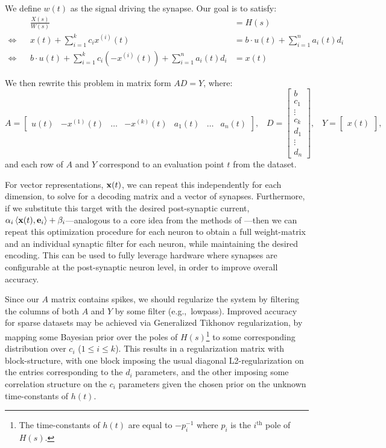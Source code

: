 We define ${w}(t)$ as the signal driving the synapse. Our goal is to satisfy:
\begin{align*}
    && \frac{{X}(s)}{{W}(s)} &= H(s) \\
    \iff && {x}(t) + \sum_{i=1}^k c_i {x}^{(i)}(t) &= {b} \cdot {u}(t) + \sum_{i=1}^n a_i(t) {d}_i \\
    \iff && {b} \cdot {u}(t) + \sum_{i=1}^k c_i \left(-{x}^{(i)}(t)\right) + \sum_{i=1}^n a_i(t) {d}_i &= {x}(t)
\end{align*}

We then rewrite this problem in matrix form $AD = Y$, where:
$$A = \left[ \begin{matrix} {u}(t) & -{x}^{(1)}(t) & \ldots & -{x}^{(k)}(t) & a_1(t) & \ldots & a_n(t)  \end{matrix} \right] \text{,} \quad D = \left[ \begin{matrix} {b} \\ c_1 \\ \vdots \\ c_k \\ d_1 \\ \vdots \\ d_n \end{matrix} \right] \text{,} \quad Y = \left[ \begin{matrix} {x}(t) \end{matrix} \right]\text{,}$$
and each row of $A$ and $Y$ correspond to an evaluation point $t$ from the dataset.

For vector representations, $\mathbf{x}(t)$, we can repeat this independently for each dimension, to solve for a decoding matrix and a vector of synapses. 
Furthermore, if we substitute this target with the desired post-synaptic current, $\alpha_i \left \langle \mathbf{x}(t)\text{,}\, \mathbf{e}_i \right \rangle + \beta_i$---analogous to a core idea from the methods of \citet{stoeckel2018}---then we can repeat this optimization procedure for each neuron to obtain a full weight-matrix and an individual synaptic filter for each neuron, while maintaining the desired encoding.
This can be used to fully leverage hardware where synapses are configurable at the post-synaptic neuron level, in order to improve overall accuracy.

Since our $A$ matrix contains spikes, we should regularize the system by filtering the columns of both $A$ and $Y$ by some filter (e.g.,~lowpass).
Improved accuracy for sparse datasets may be achieved via Generalized Tikhonov regularization, by mapping some Bayesian prior over the poles of $H(s)$\footnote{The time-constants of $h(t)$ are equal to $-p_i^{-1}$ where $p_i$ is the $i^\text{th}$ pole of $H(s)$.} to some corresponding distribution over $c_i$ ($1 \le i \le k$).
This results in a regularization matrix with block-structure, with one block imposing the usual diagonal L2-regularization on the entries corresponding to the $d_i$ parameters, and the other imposing some correlation structure on the $c_i$ parameters given the chosen prior on the unknown time-constants of $h(t)$.

